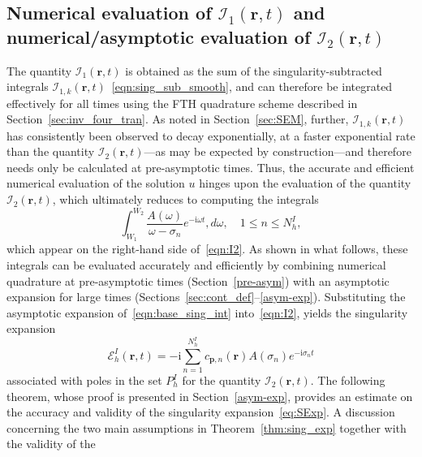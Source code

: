 \documentclass[11pt]{article}
\theoremstyle{plain}
\theoremstyle{remark}
\def \br{\mathbf{r}}
\def \bp{\mathbf{p}}
\begin{document}

\subsection{Numerical evaluation of $\mathcal{I}_{1}(\br,t)$ and numerical/asymptotic evaluation of $\mathcal{I}_{2}(\br,t)$}\label{sec:I2eval}

The quantity $\mathcal{I}_1(\br,t)$ is obtained as the sum of the
singularity-subtracted integrals
$\mathcal{I}_{1,k}(\br,t)$~\eqref{eqn:sing_sub_smooth}, and can
therefore be integrated effectively for all times using the FTH
quadrature scheme described in Section~\ref{sec:inv_four_tran}. As
noted in Section~\ref{sec:SEM}, further, $\mathcal{I}_{1,k}(\br,t)$
has consistently been observed to decay exponentially, at a faster
exponential rate than the quantity $\mathcal{I}_2(\br,t)$---as may be
expected by construction---and therefore needs only be calculated at
pre-asymptotic times. Thus, the accurate and efficient numerical
evaluation of the solution $u$ hinges upon the evaluation of the
quantity $\mathcal{I}_{2}(\br,t)$, which ultimately reduces to
computing the integrals
\begin{equation}\label{eqn:base_sing_int}
\int_{W_1}^{W_2} \frac{A(\omega)}{\omega - \sigma_n}e^{-\mathrm{i}\omega t},d\omega,
\quad 1 \le n \le N^I_h,
\end{equation}
which appear on the right-hand side of~\eqref{eqn:I2}. As shown in
what follows, these integrals can be evaluated accurately and
efficiently by combining numerical quadrature at pre-asymptotic times
(Section~\ref{pre-asym}) with an asymptotic expansion for large times
(Sections~\ref{sec:cont_def}--\ref{asym-exp}). Substituting the asymptotic expansion of~\eqref{eqn:base_sing_int} into~\eqref{eqn:I2}, yields the singularity expansion
\begin{equation}
  \label{eq:SExp}
  \mathcal{E}_h^{I}(\br,t) = -\mathrm{i}\sum_{n = 1}^{N_h^{I}} c_{\bp,n}(\br) A(\sigma_n)e^{-\mathrm{i}\sigma_nt}
\end{equation}
associated with poles in the set $P^I_h$ for the quantity
$\mathcal{I}_2(\br,t)$. The following theorem, whose proof is
presented in Section~\ref{asym-exp}, provides an estimate on the
accuracy and validity of the singularity expansion~\eqref{eq:SExp}. A
discussion concerning the two main assumptions in
Theorem~\ref{thm:sing_exp} together with the validity of the
\end{document}
